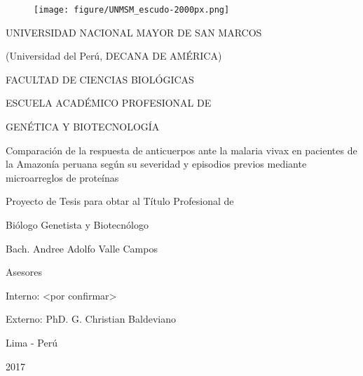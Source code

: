 \documentclass[]{article}
\title{}
\author{}
\date{}
\begin{document}
\renewcommand{\contentsname}{Índice General} 
\renewcommand{\tablename}{Tabla}
\renewcommand{\tableautorefname}{Tabla}


\clearpage
{} \vspace*{\fill}

\begin{centering}

\begin{figure}[!ht]
  \begin{center}
    \texttt{[image: figure/UNMSM\_escudo-2000px.png]}
  \end{center}
\end{figure}

\Large
UNIVERSIDAD NACIONAL MAYOR DE SAN MARCOS

\large
(Universidad del Perú, DECANA DE AMÉRICA)

\vspace{.5 cm}

\Large
FACULTAD DE CIENCIAS BIOLÓGICAS

\vspace{.5 cm}

\normalsize
ESCUELA ACADÉMICO PROFESIONAL DE

GENÉTICA Y BIOTECNOLOGÍA

\vspace{1.5 cm}

\Large
Comparación de la respuesta de anticuerpos ante la %
malaria vivax 
en pacientes de la Amazonía peruana %
según su severidad y episodios previos %
mediante microarreglos de proteínas

\vspace{1.5 cm}

\Large
Proyecto de Tesis para obtar al Título Profesional de 

Biólogo Genetista y Biotecnólogo

\vspace{1 cm}

\Large
Bach. Andree Adolfo Valle Campos

\vspace{1.2 cm}

\Large
Asesores 

Interno: <por confirmar>%

Externo: PhD. G. Christian Baldeviano


\vspace{1.2 cm}

Lima - Perú

\vspace{.5 cm}

2017

\end{centering}
\end{document}
